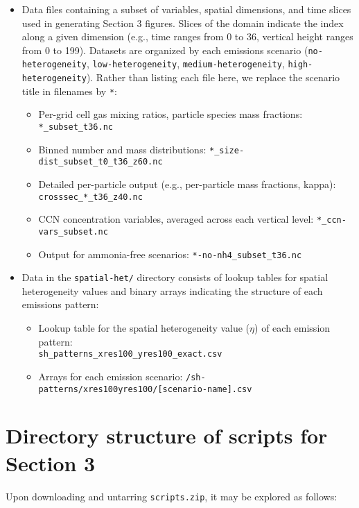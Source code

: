 \documentclass[gmd,manuscript]{copernicus}
\begin{document}
\begin{itemize}
    \item Data files containing a subset of variables, spatial dimensions, and time slices used in generating Section 3 figures. Slices 
    of the domain indicate the index along a given dimension (e.g., time ranges from 0 to 36, vertical height ranges from 0 to 199). Datasets 
    are organized by each emissions scenario (\texttt{no-heterogeneity}, \texttt{low-heterogeneity}, \texttt{medium-heterogeneity}, \texttt{high-heterogeneity}). 
    Rather than listing each file here, we replace the scenario title in filenames by \texttt{*}:
    \begin{itemize}
      \item Per-grid cell gas mixing ratios, particle species mass fractions: \texttt{*\_subset\_t36.nc}
      \item Binned number and mass distributions: \texttt{*\_size-dist\_subset\_t0\_t36\_z60.nc}
      \item Detailed per-particle output (e.g., per-particle mass fractions, kappa): \texttt{crosssec\_*\_t36\_z40.nc}
      \item CCN concentration variables, averaged across each vertical level: \texttt{*\_ccn-vars\_subset.nc}
      \item Output for ammonia-free scenarios: \texttt{*-no-nh4\_subset\_t36.nc}
    \end{itemize}
    \item Data in the \texttt{spatial-het/} directory consists of lookup tables for spatial heterogeneity values and binary
    arrays indicating the structure of each emissions pattern:
	\begin{itemize}
	  \item Lookup table for the spatial heterogeneity value ($\eta$) of each emission pattern: \\
    \texttt{sh\_patterns\_xres100\_yres100\_exact.csv}
	  \item Arrays for each emission scenario: \texttt{/sh-patterns/xres100yres100/[scenario-name].csv}
	\end{itemize}
\end{itemize}

\section*{Directory structure of scripts for Section 3}

Upon downloading and untarring \texttt{scripts.zip}, it may be explored as follows:
\end{document}
